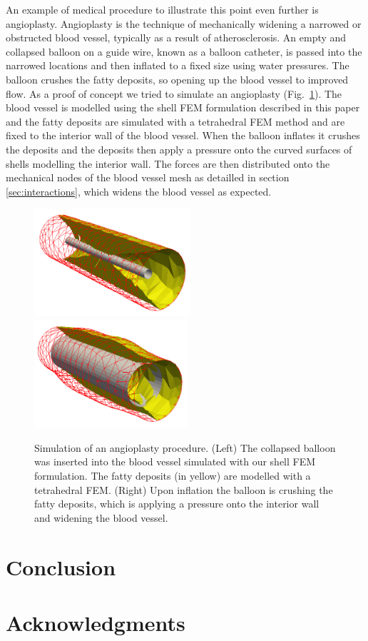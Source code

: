 \documentclass{llncs}
\begin{document}
An example of medical procedure to illustrate this point even further is angioplasty. Angioplasty is the technique of mechanically widening a narrowed or obstructed blood vessel, typically as a result of atherosclerosis. An empty and collapsed balloon on a guide wire, known as a balloon catheter, is passed into the narrowed locations and then inflated to a fixed size using water pressures. The balloon crushes the fatty deposits, so opening up the blood vessel to improved flow. As a proof of concept we tried to simulate an angioplasty (Fig.~\ref{fig-stent}). The blood vessel is modelled using the shell FEM formulation described in this paper and the fatty deposits are simulated with a tetrahedral FEM method and are fixed to the interior wall of the blood vessel. When the balloon inflates it crushes the deposits and the deposits then apply a pressure onto the curved surfaces of shells modelling the interior wall. The forces are then distributed onto the mechanical nodes of the blood vessel mesh as detailled in section \ref{sec:interactions}, which widens the blood vessel as expected. 

\begin{figure}
\centering
\includegraphics[height=4cm]{images/stent_begin.png}
\includegraphics[height=4cm]{images/stent_end.png}
\caption {Simulation of an angioplasty procedure. (Left) The collapsed balloon was inserted into the blood vessel simulated with our shell FEM formulation. The fatty deposits (in yellow) are modelled with a tetrahedral FEM. (Right) Upon inflation the balloon is crushing the fatty deposits, which is applying a pressure onto the interior wall and widening the blood vessel.}
\label{fig-stent}
\end{figure}


\section{Conclusion}
\section*{Acknowledgments}



\end{document}
